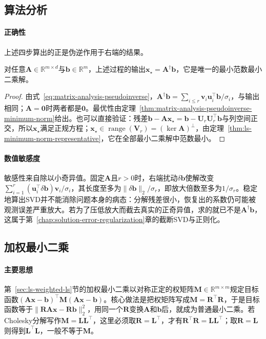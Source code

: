 \subsection{算法分析}

\paragraph{正确性}
上述四步算出的正是伪逆作用于右端的结果。

\begin{theorem}
\label{thm:ls-svd-solve}
对任意$\bm A\in\mathbb R^{m\times d}$与$\bm b\in\mathbb R^m$，上述过程的输出$\bm x_\star=\bm A^\dagger\bm b$，它是唯一的最小范数最小二乘解。
\end{theorem}
\begin{proof}
由式~\eqref{eq:matrix-analysis-pseudoinverse}，$\bm A^\dagger\bm b=\sum_{i\leq r}\bm v_i\bm u_i^\top\bm b/\sigma_i$，与输出相同；$\bm A=\bm0$时两者都是$\bm0$。最优性由定理~\ref{thm:matrix-analysis-pseudoinverse-minimum-norm}给出。也可以直接验证：残差$\bm b-\bm A\bm x_\star=\bm b-\bm U_r\bm U_r^\top\bm b$与列空间正交，所以$\bm x_\star$满足正规方程；$\bm x_\star\in\operatorname{range}(\bm V_r)=(\ker\bm A)^\perp$，由定理~\ref{thm:ls-minimum-norm-representative}，它在全部最小二乘解中范数最小。
\end{proof}

\paragraph{数值敏感度}
敏感性来自除以小奇异值。固定$\bm A$且$r>0$时，右端扰动$\delta\bm b$使解改变$\sum_{i=1}^r(\bm u_i^\top\delta\bm b)\bm v_i/\sigma_i$，其长度至多为$\lVert\delta\bm b\rVert_2/\sigma_r$，即放大倍数至多为$1/\sigma_r$。稳定地算出SVD并不能消除问题本身的病态：分解残差很小，恢复出的系数仍可能被观测误差严重放大。若为了压低放大而截去真实的正奇异值，求的就已不是$\bm A^\dagger\bm b$，这属于第~\ref{chap:solution-error-regularization}章的截断SVD与正则化。

\subsection{加权最小二乘}
\label{sec:ls-weighted-svd-solve}

\paragraph{主要思想}
第~\ref{sec:ls-weighted-ls}节的加权最小二乘以对称正定的权矩阵$\bm M\in\mathbb R^{m\times m}$规定目标函数$(\bm A\bm x-\bm b)^\top\bm M(\bm A\bm x-\bm b)$。核心做法是把权矩阵写成$\bm M=\bm R^\top\bm R$，于是目标函数等于$\lVert\bm R\bm A\bm x-\bm R\bm b\rVert_2^2$，用同一个$\bm R$变换$\bm A$和$\bm b$后，就成为普通最小二乘。若Cholesky分解写作$\bm M=\bm L\bm L^\top$，这里必须取$\bm R=\bm L^\top$，才有$\bm R^\top\bm R=\bm L\bm L^\top$；取$\bm R=\bm L$则得到$\bm L^\top\bm L$，一般不等于$\bm M$。

